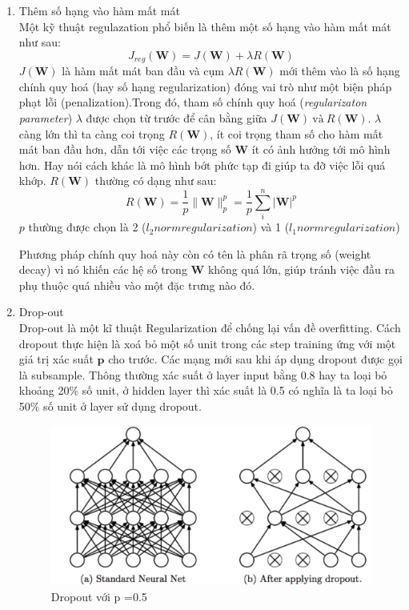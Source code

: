 \begin{enumerate}
\item Thêm số hạng vào hàm mất mát\\
  Một kỹ thuật regulazation phổ biến là thêm một số hạng vào hàm mất mát như sau:
\begin{equation}
	J_{reg}(\textbf{W}) = J(\textbf{W})+ \lambda R(\textbf{W})
\end{equation}
$J(\textbf{W})$ là hàm mất mát ban đầu và cụm $ \lambda R(\textbf{W})$  mới thêm vào là số hạng chính quy hoá (hay số hạng regularization) đóng vai trò như một biện pháp phạt lỗi (penalization).Trong đó, tham số chính quy hoá (\textit{regularizaton parameter}) $\lambda$ được chọn từ trước để cân bằng giữa $J(\textbf{W}) ~\text{và}~ R(\textbf{W})$. $\lambda$ càng lớn thì ta càng coi trọng $R(\textbf{W})$, ít coi trọng tham số cho hàm mất mát ban đầu hơn, dẫn tới việc các trọng số $\textbf{W}$ ít có ảnh hưởng tới mô hình hơn. Hay nói cách khác là mô hình bớt phức tạp đi giúp ta đỡ việc lỗi quá khớp.
$R(\textbf{W})$ thường có dạng như sau:
\begin{equation}
R(\textbf{W})= \frac{1}{p}\|\textbf{W}\|^p_p = \frac{1}{p}\sum^{n}_i |\textbf{W}|^p
\end{equation}
$p$ thường được chọn là 2 (\textit{$l_2 norm regularization$}) và 1 (\textit{$l_1 norm regularization$})\par
  Phương pháp chính quy hoá này còn có tên là phân rã trọng số (weight decay) vì nó khiến các hệ số trong $\textbf{W}$ không quá lớn, giúp tránh việc đầu ra phụ thuộc quá nhiều vào một đặc trưng nào đó.

\item Drop-out\\
Drop-out là một kĩ thuật Regularization để chống lại vấn đề overfitting. Cách dropout thực hiện là xoá bỏ một số unit trong các step training ứng với một giá trị xác suất $\textbf{p}$ cho trước. Các mạng mới sau khi áp dụng dropout được gọi là subsample. Thông thường xác suất ở layer input bằng 0.8 hay ta loại bỏ khoảng 20\% số unit, ở hidden layer thì xác suất là 0.5 có nghĩa là ta loại bỏ 50\% số unit ở layer sử dụng dropout.

\begin{center}
 	\begin{figure}[H]
    \begin{center}
    \includegraphics[scale=0.4]{chap3/image/dropout.png}
    \end{center}
    \caption{Dropout với p =0.5}
    \label{fig:dropout}
    \end{figure}
\end{center}


\end{enumerate}
